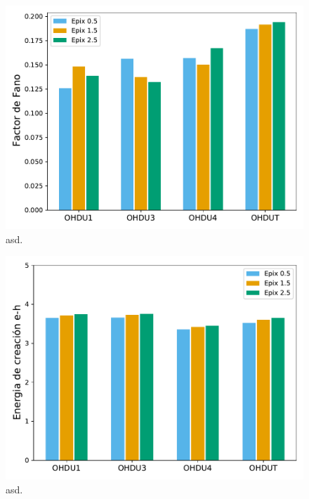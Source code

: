 \begin{figure}[H]
    \centering
    \includegraphics[scale=0.4]{Figs/Fano_vs_Epix.pdf}
    \caption{\footnotesize{asd.}}
    \label{fig:FanoVsEpix}
\end{figure}
\begin{figure}[H]
    \centering
    \includegraphics[scale=0.4]{Figs/EnergiaCreacion_vs_Epix.pdf}
    \caption{\footnotesize{asd.}}
    \label{fig:EnergiadeCreacionVsEpix}
\end{figure}
